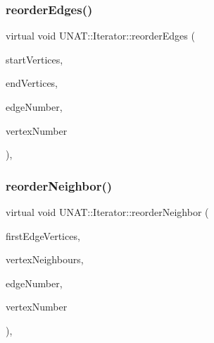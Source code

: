 \subsubsection{\texorpdfstring{reorderEdges()}{reorderEdges()}\hspace{0.1cm}{\footnotesize\ttfamily [2/2]}}
{\footnotesize\ttfamily virtual void U\+N\+A\+T\+::\+Iterator\+::reorder\+Edges (\begin{DoxyParamCaption}\item[{\mbox{\hyperlink{include_2swMacro_8h_a113cf5f6b5377cdf3fac6aa4e443e9aa}{sw\+Int}} $\ast$}]{start\+Vertices,  }\item[{\mbox{\hyperlink{include_2swMacro_8h_a113cf5f6b5377cdf3fac6aa4e443e9aa}{sw\+Int}} $\ast$}]{end\+Vertices,  }\item[{\mbox{\hyperlink{include_2swMacro_8h_a113cf5f6b5377cdf3fac6aa4e443e9aa}{sw\+Int}}}]{edge\+Number,  }\item[{\mbox{\hyperlink{include_2swMacro_8h_a113cf5f6b5377cdf3fac6aa4e443e9aa}{sw\+Int}}}]{vertex\+Number }\end{DoxyParamCaption})\hspace{0.3cm}{\ttfamily [inline]}, {\ttfamily [virtual]}}

\mbox{\label{classUNAT_1_1Iterator_ac54a79d677f7452d03a02fea6fb435f3}} 
\subsubsection{\texorpdfstring{reorderNeighbor()}{reorderNeighbor()}\hspace{0.1cm}{\footnotesize\ttfamily [1/2]}}
{\footnotesize\ttfamily virtual void U\+N\+A\+T\+::\+Iterator\+::reorder\+Neighbor (\begin{DoxyParamCaption}\item[{\mbox{\hyperlink{include_2swMacro_8h_a113cf5f6b5377cdf3fac6aa4e443e9aa}{sw\+Int}} $\ast$}]{first\+Edge\+Vertices,  }\item[{\mbox{\hyperlink{include_2swMacro_8h_a113cf5f6b5377cdf3fac6aa4e443e9aa}{sw\+Int}} $\ast$}]{vertex\+Neighbours,  }\item[{\mbox{\hyperlink{include_2swMacro_8h_a113cf5f6b5377cdf3fac6aa4e443e9aa}{sw\+Int}}}]{edge\+Number,  }\item[{\mbox{\hyperlink{include_2swMacro_8h_a113cf5f6b5377cdf3fac6aa4e443e9aa}{sw\+Int}}}]{vertex\+Number }\end{DoxyParamCaption})\hspace{0.3cm}{\ttfamily [inline]}, {\ttfamily [virtual]}}

